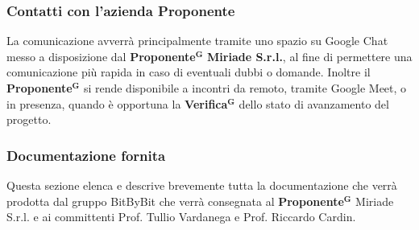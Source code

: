 \documentclass[a4paper,12pt]{article}
\newcommand{\term}[1]{\textbf{#1}$^\mathbf{G}$}
\begin{document}
\subsubsection{Contatti con l'azienda Proponente}
La comunicazione avverrà principalmente tramite uno spazio su Google Chat messo a disposizione dal \term{Proponente} \textbf{Miriade S.r.l.}, al fine di permettere una comunicazione più rapida in caso di eventuali dubbi o domande.
Inoltre il \term{Proponente} si rende disponibile a incontri da remoto, tramite Google Meet, o in presenza, quando è opportuna la \term{Verifica} dello stato di avanzamento del progetto.

\subsubsection{Documentazione fornita}
Questa sezione elenca e descrive brevemente tutta la documentazione che verrà prodotta dal gruppo BitByBit che verrà consegnata al \term{Proponente} Miriade S.r.l. e ai committenti Prof. Tullio Vardanega e Prof. Riccardo Cardin.
\end{document}

